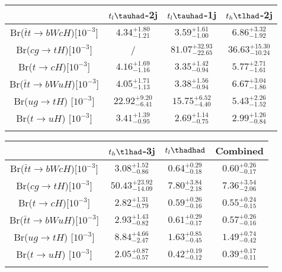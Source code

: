 \centering
\begin{tabular}{cccc} \toprule\toprule
 & $t_l\tauhad$-2j & $t_l\tauhad$-1j & $t_h\tlhad$-2j\\\midrule
Br($\bar{t}t\to bWcH$)[$10^{-3}$]    & $4.34^{+1.80}_{-1.21}$ & $3.59^{+1.61}_{-1.00}$ & $6.86^{+3.32}_{-1.92}$\\
Br($cg\to tH$)[$10^{-3}]$            &  / & $81.07^{+32.93}_{-22.65}$ & $36.63^{+15.30}_{-10.24}$\\
Br($t\to cH$)[$10^{-3}$]             & $4.16^{+1.69}_{-1.16}$ & $3.35^{+1.42}_{-0.94}$ & $5.77^{+2.71}_{-1.61}$\\
Br($\bar{t}t\to bWuH$)[$10^{-3}$]    & $4.05^{+1.71}_{-1.13}$ & $3.38^{+1.56}_{-0.94}$ & $6.67^{+3.04}_{-1.86}$\\
Br($ug\to tH$) [$10^{-3}$]           & $22.92^{+9.20}_{-6.41}$ & $15.75^{+6.52}_{-4.40}$ & $5.43^{+2.26}_{-1.52}$\\
Br($t\to uH$)  [$10^{-3}$]           & $3.41^{+1.39}_{-0.95}$ & $2.69^{+1.14}_{-0.75}$ & $2.99^{+1.26}_{-0.84}$\\
\bottomrule\bottomrule\\
\end{tabular}
\begin{tabular}{cccc} \toprule\toprule
 & $t_h\tlhad$-3j & $t_l\thadhad$ & Combined\\\midrule
Br($\bar{t}t\to bWcH$)[$10^{-3}$]     & $3.08^{+1.52}_{-0.86}$ & $0.64^{+0.29}_{-0.18}$ & $0.60^{+0.26}_{-0.17}$\\
Br($cg\to tH$)[$10^{-3}]$             & $50.43^{+23.92}_{-14.09}$ & $7.80^{+3.84}_{-2.18}$ & $7.36^{+3.54}_{-2.06}$\\
Br($t\to cH$)[$10^{-3}$]              & $2.82^{+1.31}_{-0.79}$ & $0.59^{+0.26}_{-0.16}$ & $0.55^{+0.24}_{-0.15}$\\
Br($\bar{t}t\to bWuH$)[$10^{-3}$]     & $2.93^{+1.43}_{-0.82}$ & $0.61^{+0.29}_{-0.17}$ & $0.57^{+0.26}_{-0.16}$\\
Br($ug\to tH$) [$10^{-3}$]            & $8.84^{+4.66}_{-2.47}$ & $1.63^{+0.85}_{-0.45}$ & $1.49^{+0.74}_{-0.42}$\\
Br($t\to uH$)  [$10^{-3}$]            & $2.05^{+0.87}_{-0.57}$ & $0.42^{+0.19}_{-0.12}$ & $0.39^{+0.17}_{-0.11}$\\
\bottomrule\bottomrule\\
\end{tabular}